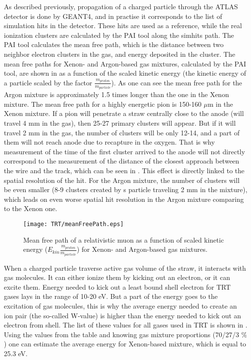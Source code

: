 As described previously, propagation of a charged particle through the ATLAS detector is done by GEANT4, and in practise it corresponds to the list of simulation hits in the detector.
These hits are used as a reference, while the real ionization clusters are calculated by the PAI tool along the simhits path.
The PAI tool calculates the mean free path, which is the distance between two neighbor electron clusters in the gas, and energy deposited in the cluster. 
The mean free paths for Xenon- and Argon-based gas mixtures, calculated by the PAI tool, are shown in  as a function of the scaled kinetic energy 
(the kinetic energy of a particle scaled by the factor $\frac{m_{proton}}{m_{particle}}$). As one can see the mean free path for the Argon mixture is approximately 1.5 times longer than the one in the Xenon mixture.
The mean free path for a highly energetic pion is 150-160 $\mu$m in the Xenon mixture. If a pion will penetrate a straw centrally close to the anode (will travel 4 mm in the gas), then 25-27 primary clusters will appear.
But if it will travel 2 mm in the gas, the number of clusters will be only 12-14, and a part of them will not reach anode due to recapture in the oxygen. 
That is why measurement of the time of the first cluster arrived to the anode will not directly correspond to the measurement of the distance of the closest approach between the wire and the track, 
which can be seen in . This effect is directly linked to the spatial resolution of the hit.
For the Argon mixture, the number of clusters will be even smaller (8-9 clusters created by s particle traveling 2 mm in the mixture), which leads on even worse spatial hit resolution in the Argon mixture comparing 
to the Xenon one.

\begin{figure}
\centering
 \texttt{[image: TRT/meanFreePath.eps]}
\caption{Mean free path of a relativistic muon as a function of scaled kinetic energy ($E_{kin}\frac{m_{proton}}{m_{particle}}$) for Xenon- and Argon-based gas mixtures.}
\label{fig:meanFreePath}
\end{figure}

When a charged particle traverse active gas volume of the straw, it interacts with gas molecules.
It can either ionize them by kicking out an electron, or it can excite them. Energy needed to kick out a least bound shell electron for TRT gases lays
in the range of 10-20 eV. But a part of the energy goes to the excitation of gas molecules, this is why the average energy needed to create an ion pair (the so-called W-value) is higher than the energy needed to 
kick out an electron from shell. The list of these values for all gases used in TRT is shown in .
Using the values from the table and knowing gas mixture proportions (70/27/3 $\%$) one can estimate the average energy for Xenon-based mixture, which is equal to 25.3 eV.

